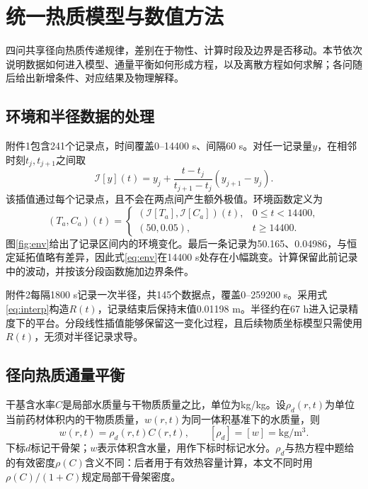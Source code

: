 \section{统一热质模型与数值方法}
\label{sec:unified}
四问共享径向热质传递规律，差别在于物性、计算时段及边界是否移动。本节依次说明数据如何进入模型、通量平衡如何形成方程，以及离散方程如何求解；各问随后给出新增条件、对应结果及物理解释。

\subsection{环境和半径数据的处理}
附件1包含241个记录点，时间覆盖0--14400 s、间隔60 s。对任一记录量$y$，在相邻时刻$t_j,t_{j+1}$之间取
\begin{equation}
\mathcal I[y](t)=y_j+\frac{t-t_j}{t_{j+1}-t_j}(y_{j+1}-y_j).
\label{eq:interp}
\end{equation}
该插值通过每个记录点，且不会在两点间产生额外极值。环境函数定义为
\begin{equation}
(T_a,C_a)(t)=
\begin{cases}
(\mathcal I[T_a],\mathcal I[C_a])(t),&0\le t<14400,\\
(50,0.05),&t\ge14400.
\end{cases}
\label{eq:env}
\end{equation}
图\ref{fig:env}给出了记录区间内的环境变化。最后一条记录为50.165\tempunit、0.04986\cunit，与恒定延拓值略有差异，因此式\eqref{eq:env}在14400 s处存在小幅跳变。计算保留此前记录中的波动，并按该分段函数施加边界条件。

附件2每隔1800 s记录一次半径，共145个数据点，覆盖0--259200 s。采用式\eqref{eq:interp}构造$R(t)$，记录结束后保持末值0.01198 m。半径约在67 h进入记录精度下的平台。分段线性插值能够保留这一变化过程，且后续物质坐标模型只需使用$R(t)$，无须对半径记录求导。

\subsection{径向热质通量平衡}
干基含水率$C$是局部水质量与干物质质量之比，单位为kg/kg。设$\rho_d(r,t)$为单位当前药材体积内的干物质质量，$w(r,t)$为同一体积基准下的水质量，则
\begin{equation}
w(r,t)=\rho_d(r,t)C(r,t),\qquad
[\rho_d]=[w]=\mathrm{kg/m^3}.
\label{eq:waterdensity}
\end{equation}
下标$d$标记干骨架；$w$表示体积含水量，用作下标时标记水分。$\rho_d$与热方程中题给的有效密度$\rho(C)$含义不同：后者用于有效热容量计算，本文不同时用$\rho(C)/(1+C)$规定局部干骨架密度。

